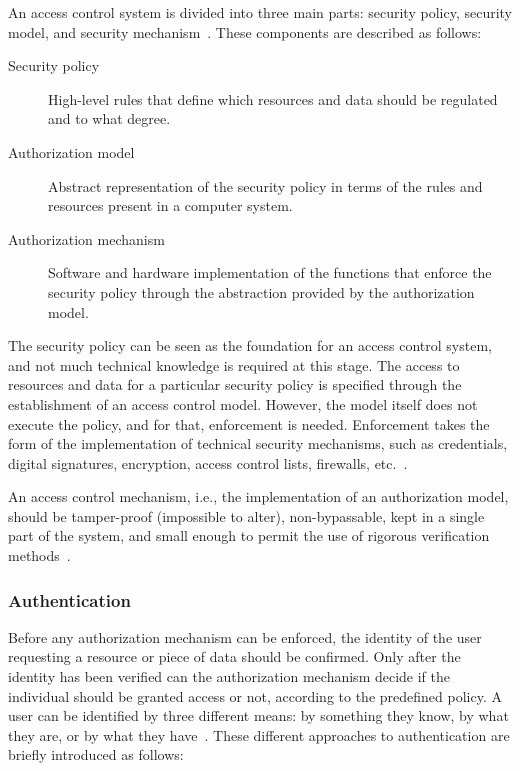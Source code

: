 \documentclass[12pt]{article}
\begin{document}
An access control system is divided into three main parts: security policy, security model, and security mechanism~\cite{access_02}. These components are described as follows:

\begin{description}
\item[Security policy] High-level rules that define which resources and data should be regulated and to what degree. 
\item[Authorization model] Abstract representation of the security policy in terms of the rules and resources present in a computer system.
\item[Authorization mechanism] Software and hardware implementation of the functions that enforce the security policy through the abstraction provided by the authorization model. 
\end{description}

The security policy can be seen as the foundation for an access control system, and not much technical knowledge is required at this stage. The access to resources and data for a particular security policy is specified through the establishment of an access control model. However, the model itself does not execute the policy, and for that, enforcement is needed. Enforcement takes the form of the implementation of technical security mechanisms, such as credentials, digital signatures, encryption, access control lists, firewalls, etc.~\cite{access_01}.

An access control mechanism, i.e., the implementation of an authorization model, should be tamper-proof (impossible to alter), non-bypassable, kept in a single part of the system, and small enough to permit the use of rigorous verification methods~\cite{access_02}.

\subsubsection{Authentication}

Before any authorization mechanism can be enforced, the identity of the user requesting a resource or piece of data should be confirmed. Only after the identity has been verified can the authorization mechanism decide if the individual should be granted access or not, according to the predefined policy. A user can be identified by three different means: by something they know, by what they are, or by what they have~\cite{stallings_01}. These different approaches to authentication are briefly introduced as follows:
\end{document}
